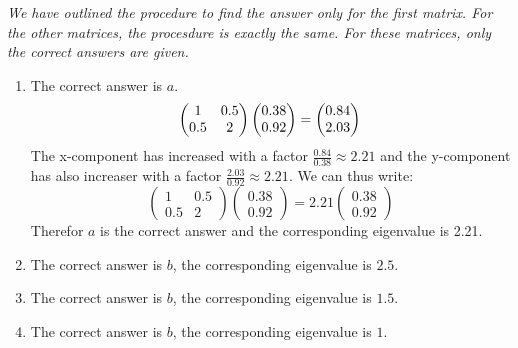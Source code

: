 \documentclass[a4paper]{report}
\begin{document}
\begin{Answer}[ref=eigen]
\textit{We have outlined the procedure to find the answer only for the first matrix. For the other matrices, the procesdure is exactly the same. For these matrices, only the correct answers are given.}
\begin{enumerate}
\item The correct answer is $a$.
\begin{equation*}
\begin{pmatrix} 1&0.5\\0.5&2\end{pmatrix} \begin{pmatrix}0.38\\0.92 \end{pmatrix} = \begin{pmatrix}0.84\\2.03 \end{pmatrix}\\
\end{equation*}
The x-component has increased with a factor $\frac{0.84}{0.38}\approx 2.21$ and the y-component has also increaser with a factor $\frac{2.03}{0.92}\approx 2.21$. We can thus write:
\begin{equation*}
\begin{pmatrix} 1&0.5\\0.5&2\end{pmatrix} \begin{pmatrix}0.38\\0.92 \end{pmatrix} =2.21 \begin{pmatrix}0.38\\0.92 \end{pmatrix}
\end{equation*}
Therefor $a$ is the correct answer and the corresponding eigenvalue is 2.21.
\item The correct answer is $b$, the corresponding eigenvalue is $2.5$.
\item The correct answer is $b$, the corresponding eigenvalue is $1.5$.
\item The correct answer is $b$, the corresponding eigenvalue is $1$.
\end{enumerate}
\end{Answer}
\end{document}
